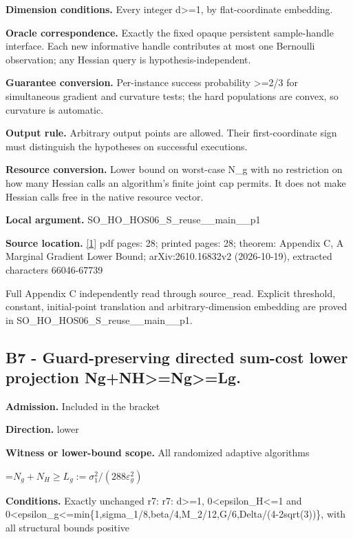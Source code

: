 \documentclass[10pt,a4paper]{article}
\newcommand{\AtlasMath}[1]{\par\begingroup\centering\setbox0=\hbox{$\displaystyle #1$}\ifdim\wd0>1.4\linewidth\typeout{ATLAS WIDE FORMULA: \the\wd0}\fi\ifdim\wd0>\linewidth\resizebox{\linewidth}{!}{\box0}\else\box0\fi\par\endgroup}
\begin{document}
\textbf{Dimension conditions.} Every integer d>=1, by flat-coordinate embedding.

\textbf{Oracle correspondence.} Exactly the fixed opaque persistent sample-handle interface. Each new informative handle contributes at most one Bernoulli observation; any Hessian query is hypothesis-independent.

\textbf{Guarantee conversion.} Per-instance success probability >=2/3 for simultaneous gradient and curvature tests; the hard populations are convex, so curvature is automatic.

\textbf{Output rule.} Arbitrary output points are allowed. Their first-coordinate sign must distinguish the hypotheses on successful executions.

\textbf{Resource conversion.} Lower bound on worst-case N\_\allowbreak{}g with no restriction on how many Hessian calls an algorithm's finite joint cap permits. It does not make Hessian calls free in the native resource vector.

\textbf{Local argument.} SO\_\allowbreak{}HO\_\allowbreak{}HOS06\_\allowbreak{}S\_\allowbreak{}reuse\_\allowbreak{}\_\allowbreak{}main\_\allowbreak{}\_\allowbreak{}p1

\textbf{Source location.} \href{https://arxiv.org/pdf/2610.16832v2}{[1]} pdf pages: 28; printed pages: 28; theorem: Appendix C, A Marginal Gradient Lower Bound; arXiv:2610.16832v2 (2026-10-19), extracted characters 66046-67739

Full Appendix C independently read through source\_\allowbreak{}read. Explicit threshold, constant, initial-point translation and arbitrary-dimension embedding are proved in SO\_\allowbreak{}HO\_\allowbreak{}HOS06\_\allowbreak{}S\_\allowbreak{}reuse\_\allowbreak{}\_\allowbreak{}main\_\allowbreak{}\_\allowbreak{}p1.

\subsection{B7 - Guard-preserving directed sum-cost lower projection Ng+NH>=Ng>=Lg.}
\textbf{Admission.} Included in the bracket

\textbf{Direction.} lower

\textbf{Witness or lower-bound scope.} All randomized adaptive algorithms

\AtlasMath{N_g+N_H\ge L_g:=\sigma_1^2/(288\varepsilon_g^2)}
\textbf{Conditions.} Exactly unchanged r7: r7: d>=1, 0<epsilon\_\allowbreak{}H<=1 and 0<epsilon\_\allowbreak{}g<=min\{1,sigma\_\allowbreak{}1/8,beta/4,M\_\allowbreak{}2/12,G/6,Delta/(4-2sqrt(3))\}, with all structural bounds positive
\end{document}
